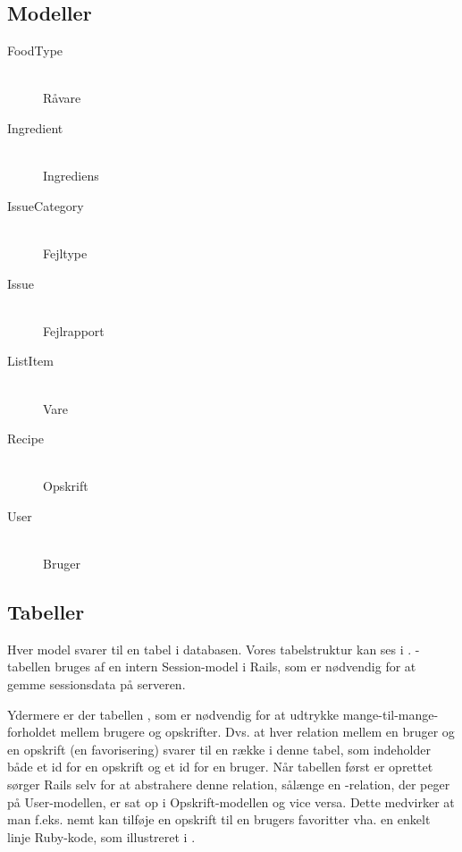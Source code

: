 \subsection{Modeller}

\begin{description}

  \item[FoodType] \hfill \\
  Råvare

  \item[Ingredient] \hfill \\
  Ingrediens

  \item[IssueCategory] \hfill \\
  Fejltype

  \item[Issue] \hfill \\
  Fejlrapport

  \item[ListItem] \hfill \\
  Vare

  \item[Recipe] \hfill \\
  Opskrift

  \item[User] \hfill \\
  Bruger

\end{description}

\subsection{Tabeller}
\label{sec:tabeller}

Hver model svarer til en tabel i databasen. Vores tabelstruktur kan ses i . -tabellen bruges af en intern Session-model i Rails, som er nødvendig for at gemme sessionsdata på serveren.

Ydermere er der tabellen , som er nødvendig for at udtrykke mange-til-mange-forholdet mellem brugere og opskrifter. Dvs. at hver relation mellem en bruger og en opskrift (en favorisering) svarer til en række i denne tabel, som indeholder både et id for en opskrift og et id for en bruger. Når tabellen først er oprettet sørger Rails selv for at abstrahere denne relation, sålænge en -relation, der peger på User-modellen, er sat op i Opskrift-modellen og vice versa. Dette medvirker at man f.eks. nemt kan tilføje en opskrift til en brugers favoritter vha. en enkelt linje Ruby-kode, som illustreret i .

